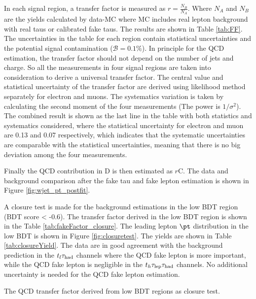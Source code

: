 In each signal region, a transfer factor is measured as $r=\frac{N_B}{N_A}$. Where $N_A$ and $N_B$ are the yields calculated by data-MC where MC includes real lepton background with real taus or calibrated fake taus. The results are shown in Table \ref{tab:FF}. The uncertainties in the table for each region contain statistical uncertainties and the potential signal contamination ($\mathcal{B}=0.1\%$). In principle for the QCD estimation, the transfer factor should not depend on the number of jets and charge. So all the measurements in four signal regions are taken into consideration to derive a universal transfer factor. The central value and statistical uncertainty of the transfer factor are derived using likelihood method separately for electron and muons. The systematics variation is taken by calculating the second moment of the four measurements (The power is $1/\sigma^2$). The combined result is shown as the last line in the table with both statistics and systematics considered, where the statistical uncertainty for electron and muon are 0.13 and 0.07 respectively, which indicates that the systematic uncertainties are comparable with the statistical uncertainties, meaning that there is no big deviation among the four measurements.


Finally the QCD contribution in D is then estimated as $r$C.
The data and background comparison after the fake tau and fake lepton estimation is shown in Figure \ref{fig:wjet_pt_postfit}.


A closure test is made for the background estimations in the low BDT region (BDT score < -0.6). The transfer factor derived in the low BDT region is shown in the Table \ref{tab:fakeFactor_closure}. The leading lepton $\pt$ distribution in the low BDT is shown in Figure \ref{fig:closuretest}. The yields are shown in Table \ref{tab:closureYield}. The data are in good agreement with the background prediction in the
$t_l\tau_\text{had}$ channels where the QCD fake lepton is more important, while the QCD fake lepton is negligible in the $t_h\tau_\text{lep}{}\tau_\text{had}$ channels. No additional uncertainty is needed for the QCD fake lepton estimation.    




\begin{table}
\caption{The QCD transfer factor derived from low BDT regions as closure test.}
\label{tab:fakeFactor_closure}

\end{table}

